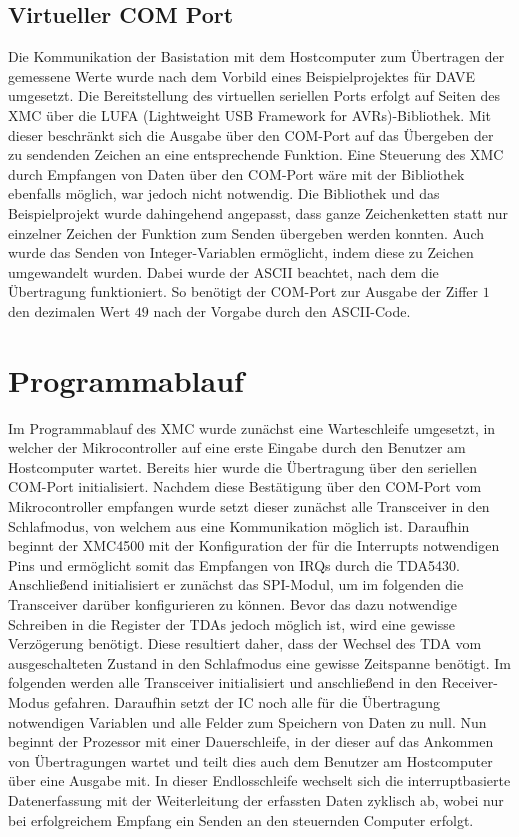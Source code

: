 \subsection{Virtueller COM Port}
Die Kommunikation der Basistation mit dem Hostcomputer zum Übertragen der gemessene Werte wurde nach dem Vorbild eines Beispielprojektes für DAVE umgesetzt. Die Bereitstellung des virtuellen seriellen Ports erfolgt auf Seiten des XMC über die LUFA (Lightweight USB Framework for AVRs)-Bibliothek. Mit dieser beschränkt sich die Ausgabe über den COM-Port auf das Übergeben der zu sendenden Zeichen an eine entsprechende Funktion. Eine Steuerung des XMC durch Empfangen von Daten über den COM-Port wäre mit der Bibliothek ebenfalls möglich, war jedoch nicht notwendig.
Die Bibliothek und das Beispielprojekt wurde dahingehend angepasst, dass ganze Zeichenketten statt nur einzelner Zeichen der Funktion zum Senden übergeben werden konnten. Auch wurde das Senden von Integer-Variablen ermöglicht, indem diese zu Zeichen umgewandelt wurden. Dabei wurde der \ac{ASCII} beachtet, nach dem die Übertragung funktioniert. So benötigt der COM-Port zur Ausgabe der Ziffer $1$ den dezimalen Wert $49$ nach der Vorgabe durch den \ac{ASCII}-Code.


\section{Programmablauf}
Im Programmablauf des XMC wurde zunächst eine Warteschleife umgesetzt, in welcher der Mikrocontroller auf eine erste Eingabe durch den Benutzer am Hostcomputer wartet. Bereits hier wurde die Übertragung über den seriellen COM-Port initialisiert. Nachdem diese Bestätigung über den COM-Port vom Mikrocontroller empfangen wurde setzt dieser zunächst alle Transceiver in den Schlafmodus, von welchem aus eine Kommunikation möglich ist. Daraufhin beginnt der XMC4500 mit der Konfiguration der für die Interrupts notwendigen Pins und ermöglicht somit das Empfangen von \acp{IRQ} durch die TDA5430. Anschließend initialisiert er zunächst das SPI-Modul, um im folgenden die Transceiver darüber konfigurieren zu können. Bevor das dazu notwendige Schreiben in die Register der TDAs jedoch möglich ist, wird eine gewisse Verzögerung benötigt. Diese resultiert daher, dass der Wechsel des TDA vom ausgeschalteten Zustand in den Schlafmodus eine gewisse Zeitspanne benötigt. 
Im folgenden werden alle Transceiver initialisiert und anschließend in den Receiver-Modus gefahren.  
Daraufhin setzt der \ac{IC} noch alle für die Übertragung notwendigen Variablen  und alle Felder zum Speichern von Daten zu null. 
Nun beginnt der Prozessor mit einer Dauerschleife, in der dieser auf das Ankommen von Übertragungen wartet und teilt dies auch dem Benutzer am Hostcomputer über eine Ausgabe mit. In dieser Endlosschleife wechselt sich die interruptbasierte Datenerfassung mit der Weiterleitung der erfassten Daten zyklisch ab, wobei nur bei erfolgreichem Empfang ein Senden an den steuernden Computer erfolgt. 

